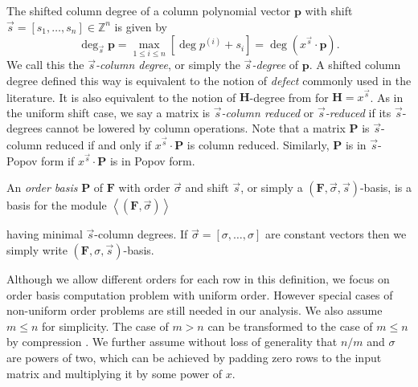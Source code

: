 The shifted column degree of a column polynomial vector $\mathbf{p}$
with shift $\vec{s}=\left[s_{1},\dots,s_{n}\right]\in\mathbb{Z}^{n}$
is given by \[
\deg_{\vec{s}}\mathbf{p}=\max_{1\le i\le n}[\deg p^{\left(i\right)}+s_{i}]=\deg(x^{\vec{s}}\cdot\mathbf{p}).\]
 We call this the \emph{$\vec{s}$-column degree}, or simply the \emph{$\vec{s}$-degree}
of $\mathbf{p}$. A shifted column degree defined this way is equivalent
to the notion of \emph{defect} commonly used in the literature. It
is also equivalent to the notion of $\mathbf{H}$-degree from \citep{BL1997}
for $\mathbf{H}=x^{\vec{s}}$. As in the uniform shift case, we say
a matrix is \emph{$\vec{s}$-column reduced} or \emph{$\vec{s}$-reduced}
if its $\vec{s}$-degrees cannot be lowered by column operations.
Note that a matrix $\mathbf{P}$ is $\vec{s}$-column reduced if and
only if $x^{\vec{s}}\cdot\mathbf{P}$ is column reduced. Similarly,
$\mathbf{P}$ is in $\vec{s}$-Popov form if $x^{\vec{s}}\cdot\mathbf{P}$
is in Popov form. 
\begin{defn}
\label{def:orderBasis} An \emph{order basis} \citep{BeLa94,BL1997}
$\mathbf{P}$ of $\mathbf{F}$ with order $\vec{\sigma}$ and shift
$\vec{s}$, or simply a $\left(\mathbf{F},\vec{\sigma},\vec{s}\right)$-basis,
is a basis for the module $\left\langle \left(\mathbf{F},\vec{\sigma}\right)\right\rangle $
%
\begin{comment}
\[
\left\langle \left(\mathbf{F},\vec{\sigma}\right)\right\rangle =\{\mathbf{p}\in\mathbb{K}\left[x\right]^{n\times1}\|\mathbf{F}\cdot\mathbf{p}=x^{\vec{\sigma}}\mathbf{r},\mathbf{r}\in\mathbb{K}[[x]]^{m\times1}\}\]

\end{comment}
{} having minimal $\vec{s}$-column degrees. If $\vec{\sigma}=\left[\sigma,\dots,\sigma\right]$
are constant vectors then we simply write $\left(\mathbf{F},\sigma,\vec{s}\right)$-basis. 
\end{defn}
%
\begin{comment}
Note that the module $\left\langle \left(\mathbf{F},\vec{\sigma}\right)\right\rangle $
does not depend on the shift $\vec{s}$. 
\end{comment}
{}

Although we allow different orders for each row in this definition,
we focus on order basis computation problem with uniform order. However
special cases of non-uniform order problems are still needed in our
analysis. We also assume $m\le n$ for simplicity. The case of $m>n$
can be transformed to the case of $m\le n$ by compression \citep{storjohann-villard:2005}.
We further assume without loss of generality that $n/m$ and $\sigma$
are powers of two, which can be achieved by padding zero rows to the
input matrix and multiplying it by some power of $x$.

